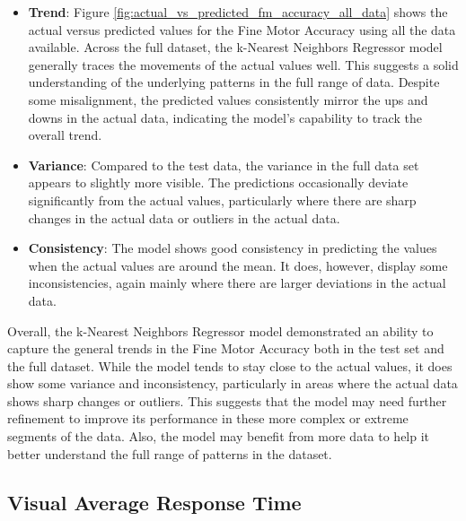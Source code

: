 \begin{itemize}
    \item \textbf{Trend}: Figure \ref{fig:actual_vs_predicted_fm_accuracy_all_data} shows the actual versus predicted values for the Fine Motor Accuracy using all the data available. 
    Across the full dataset, the k-Nearest Neighbors Regressor model generally traces the movements of the actual values well. This suggests a solid understanding of the underlying patterns
    in the full range of data. Despite some misalignment, the predicted values consistently mirror the ups and downs in the actual data, indicating the model's capability to track the 
    overall trend.
    \item \textbf{Variance}: Compared to the test data, the variance in the full data set appears to slightly more visible. The predictions occasionally deviate significantly from the
    actual values, particularly where there are sharp changes in the actual data or outliers in the actual data.
    \item \textbf{Consistency}: The model shows good consistency in predicting the values when the actual values are around the mean. It does, however, display some inconsistencies, again
    mainly where there are larger deviations in the actual data.    
\end{itemize}

Overall, the k-Nearest Neighbors Regressor model demonstrated an ability to capture the general trends in the Fine Motor Accuracy both in the test set and the full dataset. While the model tends
to stay close to the actual values, it does show some variance and inconsistency, particularly in areas where the actual data shows sharp changes or outliers. This suggests that the
model may need further refinement to improve its performance in these more complex or extreme segments of the data. Also, the model may benefit from more data to help it better understand
the full range of patterns in the dataset.

\subsection*{Visual Average Response Time}

